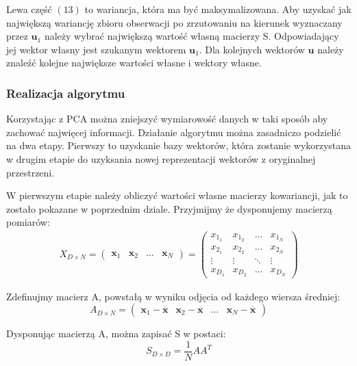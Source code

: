 \documentclass{article}
\newcommand{\bb}{\textbf}
\begin{document}
Lewa część $(13)$ to wariancja, która ma być maksymalizowana. Aby uzyskać jak największą wariancję zbioru obserwacji po zrzutowaniu na kierunek wyznaczany przez $\bb{u}_1$ należy wybrać największą wartość własną macierzy S. Odpowiadający jej wektor własny jest szukanym wektorem $\bb{u}_1$. Dla kolejnych wektorów $\bb{u}$ należy znaleźć kolejne największe wartości własne i wektory własne.

\subsubsection{Realizacja algorytmu} 
Korzystając z PCA można zniejszyć wymiarowość danych w taki sposób aby zachować najwięcej informacji. Działanie algorytmu można zasadniczo podzielić na dwa etapy. Pierwszy to uzyskanie bazy wektorów, która zostanie wykorzystana w drugim etapie do uzyksania nowej reprezentacji wektorów z oryginalnej przestrzeni.

W pierwszym etapie należy obliczyć wartości własne macierzy kowariancji, jak to zostało pokazane w poprzednim dziale. Przyjmijmy że dysponujemy macierzą pomiarów:
\begin{align}
	X_{D \times N} = 
	\left( \begin{array}{llll}
		\bb{x}_1 & \bb{x}_2 & \ldots & \bb{x}_N
	\end{array} \right)	
	=
	\left( \begin{array}{llll}
		x_{1_1} & x_{1_2} & \ldots & x_{1_N} \\
		x_{2_1} & x_{2_2} & \ldots & x_{2_N} \\
		\vdots  & \vdots  & \ddots & \vdots  \\
		x_{D_1} & x_{D_2} & \ldots & x_{D_N}
	\end{array} \right)
\end{align}

Zdefinujmy macierz A, powstałą w wyniku odjęcia od każdego wiersza średniej:
\begin{equation}
	A_{D \times N} = 
	\left( \begin{array}{llll}
	\bb{x}_1 - \overline{\bb{x}} & \bb{x}_2 - \overline{\bb{x}} & \ldots & \bb{x}_N - \overline{\bb{x}}
	\end{array} \right)
\end{equation}


Dysponując macierzą A, można zapisać S w postaci:
\begin{equation}
	S_{D \times D} = \frac{1}{N} A A^T
\end{equation}
\end{document}
